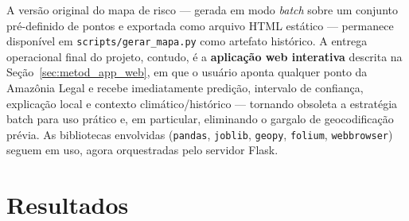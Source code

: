 A versão original do mapa de risco --- gerada em modo \emph{batch} sobre um conjunto pré-definido de pontos e exportada como arquivo HTML estático --- permanece disponível em \texttt{scripts/gerar\_mapa.py} como artefato histórico. A entrega operacional final do projeto, contudo, é a \textbf{aplicação web interativa} descrita na Seção~\ref{sec:metod_app_web}, em que o usuário aponta qualquer ponto da Amazônia Legal e recebe imediatamente predição, intervalo de confiança, explicação local e contexto climático/histórico --- tornando obsoleta a estratégia batch para uso prático e, em particular, eliminando o gargalo de geocodificação prévia. As bibliotecas envolvidas (\texttt{pandas}, \texttt{joblib}, \texttt{geopy}, \texttt{folium}, \texttt{webbrowser}) seguem em uso, agora orquestradas pelo servidor Flask.

\chapter{Resultados}
\label{cap:resultados}

